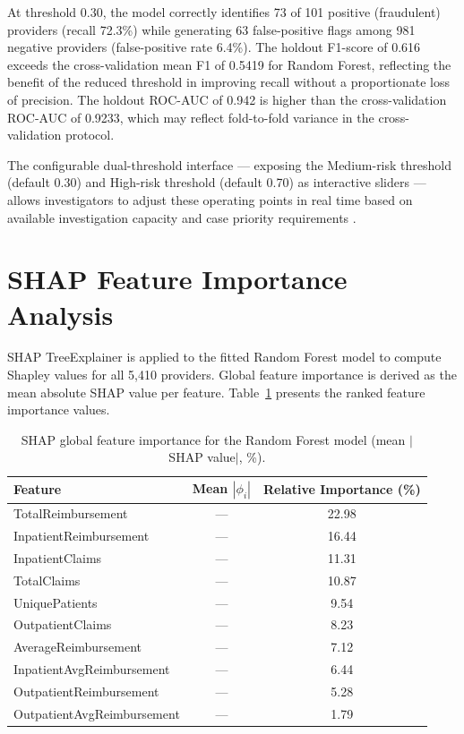 At threshold 0.30, the model correctly identifies 73 of 101 positive (fraudulent) providers (recall 72.3\%) while generating 63 false-positive flags among 981 negative providers (false-positive rate 6.4\%). The holdout F1-score of 0.616 exceeds the cross-validation mean F1 of 0.5419 for Random Forest, reflecting the benefit of the reduced threshold in improving recall without a proportionate loss of precision. The holdout ROC-AUC of 0.942 is higher than the cross-validation ROC-AUC of 0.9233, which may reflect fold-to-fold variance in the cross-validation protocol.

The configurable dual-threshold interface --- exposing the Medium-risk threshold (default 0.30) and High-risk threshold (default 0.70) as interactive sliders --- allows investigators to adjust these operating points in real time based on available investigation capacity and case priority requirements \cite{b18}.

\section{SHAP Feature Importance Analysis}
\label{sec:shap-results}

SHAP TreeExplainer is applied to the fitted Random Forest model to compute Shapley values for all 5,410 providers. Global feature importance is derived as the mean absolute SHAP value per feature. Table~\ref{tab:feat-imp} presents the ranked feature importance values.

\begin{table}[htbp]
\centering
\caption{SHAP global feature importance for the Random Forest model (mean $|$SHAP value$|$, \%).}
\label{tab:feat-imp}
\begin{tabular}{@{}lcc@{}}
\toprule
\textbf{Feature} & \textbf{Mean $|\phi_i|$} & \textbf{Relative Importance (\%)} \\
\midrule
TotalReimbursement          & --- & 22.98 \\
InpatientReimbursement      & --- & 16.44 \\
InpatientClaims             & --- & 11.31 \\
TotalClaims                 & --- & 10.87 \\
UniquePatients              & --- & 9.54  \\
OutpatientClaims            & --- & 8.23  \\
AverageReimbursement        & --- & 7.12  \\
InpatientAvgReimbursement   & --- & 6.44  \\
OutpatientReimbursement     & --- & 5.28  \\
OutpatientAvgReimbursement  & --- & 1.79  \\
\bottomrule
\end{tabular}
\end{table}

